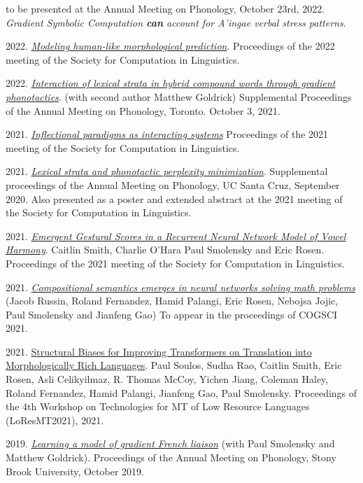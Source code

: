 \documentclass[11pt]{article}
\newcommand{\itt}[1]{\textit{#1}}
\newcommand{\ii}{\item}
\begin{document}
\begin{enumerate}[label={[\arabic*]}]
\ii to be presented at the Annual Meeting on Phonology, October 23rd, 2022. \textit{Gradient Symbolic Computation \textbf{can} account for A'ingae verbal stress patterns}.
\ii 2022. \href{https://aclanthology.org/2022.scil-1.11/}{\textit{Modeling human-like morphological prediction}}. Proceedings of the 2022 meeting of the Society for Computation in Linguistics.
\ii 2022. \href{https://journals.linguisticsociety.org/proceedings/index.php/amphonology/article/view/5158/4833}{\textit{Interaction of lexical strata in hybrid compound words through gradient phonotactics}}. (with second author Matthew Goldrick) Supplemental Proceedings of the Annual Meeting on Phonology, Toronto. October 3, 2021.
\ii 2021. \href{https://scholarworks.umass.edu/scil/vol4/iss1/14/}{\itt{Inflectional paradigms as interacting systems}} Proceedings of the 2021 meeting of the Society for Computation in Linguistics.
\ii 2021. \href{https://scholarworks.umass.edu/scil/vol4/iss1/49/}{\itt{Lexical strata and phonotactic perplexity minimization}}. Supplemental proceedings of the Annual Meeting on Phonology, UC Santa Cruz, September 2020. Also presented as a poster and extended abstract at the 2021 meeting of the Society for Computation in Linguistics.
\ii 2021. \href{https://caitlinsmith14.github.io/pdf/smithetal_scil2021_paper.pdf}{\itt{Emergent Gestural Scores in a Recurrent Neural Network Model of Vowel Harmony}}. Caitlin Smith, Charlie O'Hara Paul Smolensky and Eric Rosen.  Proceedings of the 2021 meeting of the Society for Computation in Linguistics.
\ii 2021. \href{https://en.x-mol.com/paper/article/1395477939799703552}{\itt{Compositional semantics emerges in neural networks solving math problems}} (Jacob Russin, Roland Fernandez, Hamid Palangi, Eric Rosen, Nebojsa Jojic, Paul Smolensky and Jianfeng Gao) To appear in the proceedings of COGSCI 2021.
\ii 2021. \href{https://arxiv.org/abs/2208.06061}{Structural Biases for Improving Transformers on Translation into Morphologically Rich Languages}. Paul Soulos, Sudha Rao, Caitlin Smith, Eric Rosen, Asli Celikyilmaz, R. Thomas McCoy, Yichen Jiang, Coleman Haley, Roland Fernandez, Hamid Palangi, Jianfeng Gao, Paul Smolensky. Proceedings of the 4th Workshop on Technologies for MT of Low Resource Languages (LoResMT2021), 2021. 
\ii 2019. \href{https://journals.linguisticsociety.org/proceedings/index.php/amphonology/article/view/4680}{\itt{Learning a model of gradient French liaison}} (with Paul Smolensky and Matthew Goldrick). Proceedings of the Annual Meeting on Phonology, Stony Brook University, October 2019.

\end{enumerate}
\end{document}
